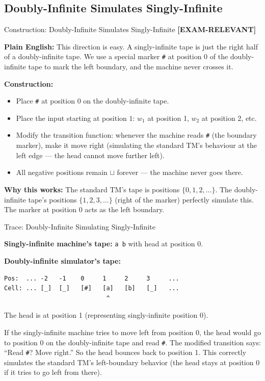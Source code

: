 \documentclass[11pt,a4paper]{article}
\newcommand{\kemark}{\textcolor{red!70!black}{\textbf{[EXAM-RELEVANT]}}}
\begin{document}
\subsection{Doubly-Infinite Simulates Singly-Infinite}

\begin{definitionbox}{Construction: Doubly-Infinite Simulates Singly-Infinite \kemark}

\textbf{Plain English:}
This direction is easy. A singly-infinite tape is just the right half of a doubly-infinite tape. We use a special marker \texttt{\#} at position 0 of the doubly-infinite tape to mark the left boundary, and the machine never crosses it.

\textbf{Construction:}
\begin{itemize}[nosep]
\item Place \texttt{\#} at position $0$ on the doubly-infinite tape.
\item Place the input starting at position $1$: $w_1$ at position 1, $w_2$ at position 2, etc.
\item Modify the transition function: whenever the machine reads \texttt{\#} (the boundary marker), make it move right (simulating the standard TM's behaviour at the left edge --- the head cannot move further left).
\item All negative positions remain $\sqcup$ forever --- the machine never goes there.
\end{itemize}

\textbf{Why this works:} The standard TM's tape is positions $\{0, 1, 2, \ldots\}$. The doubly-infinite tape's positions $\{1, 2, 3, \ldots\}$ (right of the marker) perfectly simulate this. The marker at position 0 acts as the left boundary.
\end{definitionbox}

\begin{examplebox}{Trace: Doubly-Infinite Simulating Singly-Infinite}

\textbf{Singly-infinite machine's tape:} \texttt{a b} with head at position 0.

\textbf{Doubly-infinite simulator's tape:}
\begin{lstlisting}
Pos:  ... -2   -1    0     1     2     3     ...
Cell: ... [_]  [_]   [#]   [a]   [b]   [_]   ...
                            ^
\end{lstlisting}

The head is at position 1 (representing singly-infinite position 0).

If the singly-infinite machine tries to move left from position 0, the head would go to position 0 on the doubly-infinite tape and read \texttt{\#}. The modified transition says: ``Read \texttt{\#}? Move right.'' So the head bounces back to position 1. This correctly simulates the standard TM's left-boundary behavior (the head stays at position 0 if it tries to go left from there).
\end{examplebox}
\end{document}

